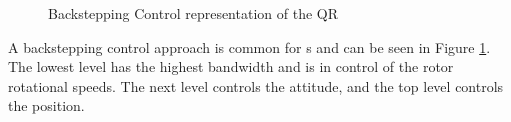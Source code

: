 %
%
\begin{figure}[h!]
	\centering
	\caption{Backstepping Control representation of the QR \label{fig:con.backstepQR}}
\end{figure}		
A backstepping control approach is common for s \cite{bibid} and can be seen in Figure \ref{fig:con.backstepQR}. The lowest level has the highest bandwidth and is in control of the rotor rotational speeds. The next level controls the  attitude, and the top level controls the  position. 


